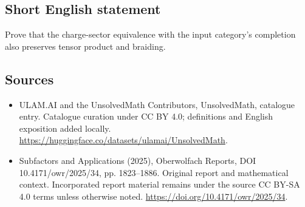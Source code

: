 \documentclass[11pt]{article}
\begin{document}
\subsection{Short English statement}
Prove that the charge-sector equivalence with the input category's completion also preserves tensor product and braiding.
\subsection{Sources}
\begin{itemize}
\item[\hypertarget{source:statement:1}{S1}] ULAM.AI and the UnsolvedMath Contributors, UnsolvedMath, catalogue entry. Catalogue curation under CC BY 4.0; definitions and English exposition added locally.
\url{https://huggingface.co/datasets/ulamai/UnsolvedMath}.
\item[\hypertarget{source:statement:2}{S2}] Subfactors and Applications (2025), Oberwolfach Reports, DOI 10.4171/owr/2025/34, pp. 1823--1886. Original report and mathematical context. Incorporated report material remains under the source CC BY-SA 4.0 terms unless otherwise noted.
\url{https://doi.org/10.4171/owr/2025/34}.
\end{itemize}
\label{end:statement}
\end{document}
